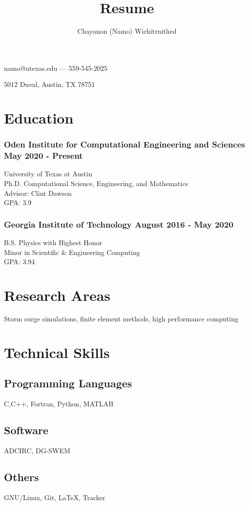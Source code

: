 \documentclass[11pt]{article}
\makeatletter
\renewcommand{\maketitle}{
  \begin{center}
    {\Large\bfseries\theauthor}

    namo@utexas.edu --- 559-545-2025

    5012 Duval, Austin, TX 78751
  \end{center}
}
\newenvironment{body}{}
\makeatother
\begin{document}
\title{Resume}
\author{Chayanon (Namo) Wichitrnithed}
\maketitle

\section{Education}
\begin{body}
  \subsubsection{Oden Institute for Computational Engineering and Sciences \hfill \textmd{May 2020 - Present}}
  University of Texas at Austin \\
  Ph.D. Computational Science, Engineering, and Mathematics \\
  Advisor: Clint Dawson \\
  GPA: 3.9

  \subsubsection{Georgia Institute of Technology \hfill \textmd{August 2016 - May 2020}}
  B.S. Physics with Highest Honor \\
  Minor in Scientific \& Engineering Computing \\
  GPA: 3.94
\end{body}
\section{Research Areas}
\begin{body}
  Storm surge simulations, finite element methods, high performance computing
\end{body}

\section{Technical Skills}
\begin{body}
\subsection{Programming Languages}

\hfill C,C++, Fortran, Python, MATLAB

\subsection{Software}
\hfill ADCIRC, DG-SWEM

\subsection{Others}
\hfill GNU/Linux, Git, \LaTeX, Tracker

\end{body}
\end{document}
